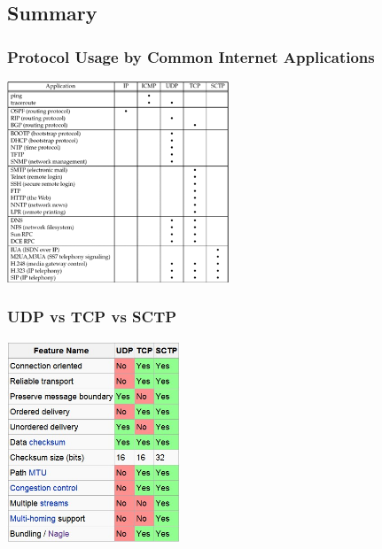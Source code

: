 \documentclass[notes,serif]{beamer}
\begin{document}
\subsection{Summary}
\begin{frame}
  \frametitle{Protocol Usage by Common Internet Applications}
  \begin{center}
  \includegraphics[height=6cm]{figs/02fig19.png}
  \end{center}
\end{frame}

\begin{frame}
  \frametitle{UDP vs TCP vs SCTP}
  \begin{center}
  \includegraphics[height=6cm]{figs/udp-tcp-sctp-comparison.png}
  \end{center}
\end{frame}
\end{document}
